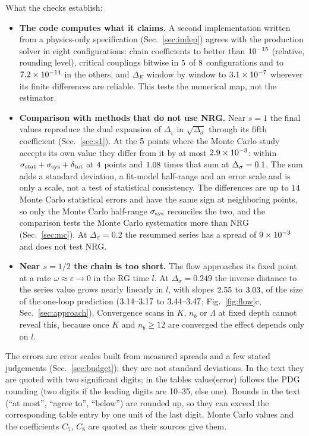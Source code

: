 \documentclass[10pt,a4paper]{article}
\newcommand{\Ds}{\Delta_\sigma}
\newcommand{\De}{\Delta_\varepsilon}
\newcommand{\DE}{\Delta_E}
\newcommand{\dtot}{\delta_{\rm tot}}
\begin{document}
What the checks establish:
\begin{itemize}
\item \textbf{The code computes what it claims.} A second implementation written from a physics-only specification
  (Sec.~\ref{sec:indep}) agrees with the production solver in eight configurations: chain coefficients to better than $10^{-15}$ (relative, rounding level),
  critical couplings bitwise in $5$ of $8$ configurations and to $7.2\times10^{-14}$ in the others, and $\DE$
  window by window to $3.1\times10^{-7}$ wherever its finite differences are reliable. This tests the numerical map, not the estimator.
\item \textbf{Comparison with methods that do not use NRG.} Near $s=1$ the final values reproduce the dual expansion of $\De$ in
  $\sqrt{\Ds}$ through its fifth coefficient (Sec.~\ref{sec:s1}). At the $5$ points where the Monte Carlo study accepts its
  own value they differ from it by at most $2.9\times10^{-3}$: within $\sigma_{\rm stat}+\sigma_{\rm sys}+\dtot$ at
  $4$ points and $1.08$ times that sum at $\Ds=\nrgmcAccDiffMaxAt$. The sum adds a standard deviation, a
  fit-model half-range and an error scale and is only a scale, not a test of statistical consistency. The differences are up to
  $14$ Monte Carlo statistical errors and have the same sign at neighboring points, so only the Monte Carlo
  half-range $\sigma_{\rm sys}$ reconciles the two, and the comparison tests the Monte Carlo systematics more than NRG
  (Sec.~\ref{sec:mc}). At $\Ds=0.2$ the resummed series has a spread of $9\times10^{-3}$ and does not test NRG.
\item \textbf{Near $s=1/2$ the chain is too short.} The flow approaches its fixed point at a rate $\omega\approx\varepsilon\to0$ in
  the RG time $l$. At $\Ds=0.249$ the inverse distance to the series value grows nearly linearly in $l$, with slopes $2.55$
  to $3.03$, of the size of the one-loop prediction ($3.14\text{--}3.17$ to $3.44\text{--}3.47$; Fig.~\ref{fig:flow}c,
  Sec.~\ref{sec:approach}). Convergence scans in $K$, $n_b$ or $\Lambda$ at fixed depth cannot reveal this, because once $K$ and
  $n_b\ge12$ are converged the effect depends only on $l$.
\end{itemize}
The errors are error scales built from measured spreads and a few stated judgements (Sec.~\ref{sec:budget}); they are not standard
deviations. In the text they are quoted with two significant digits; in the tables value(error) follows the PDG rounding (two digits
if the leading digits are 10--35, else one). Bounds in the text (``at most'', ``agree to'', ``below'') are rounded up, so they can
exceed the corresponding table entry by one unit of the last digit. Monte Carlo values and the coefficients $C_7$, $C_8$ are quoted
as their sources give them.
\end{document}
